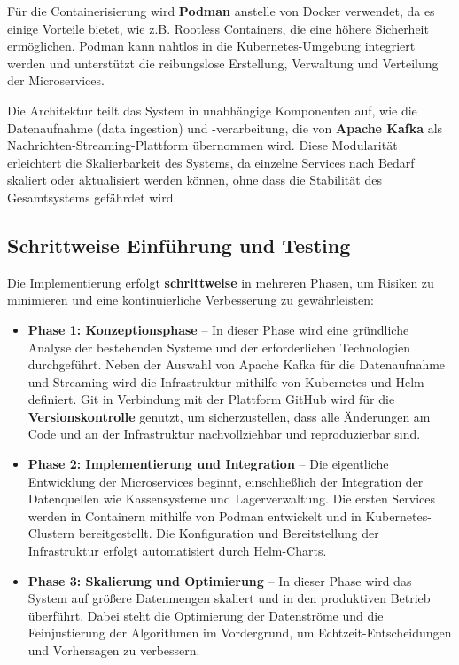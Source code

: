 \documentclass[%
pdftex,
oneside,			%
11pt,				%
parskip=half,		%
headheight = 12pt,	%
headsepline,		%
footsepline,		%
footheight = 16pt,	%
abstracton,		%
DIV=calc,		%
BCOR=8mm,		%
headinclude=false,	%
footinclude=false,	%
listof=totoc,		%
toc=bibliography,	%
]{scrreprt}	%
\begin{document}
        Für die Containerisierung wird \textbf{Podman} anstelle von Docker verwendet, da es einige Vorteile bietet, wie z.B. Rootless Containers, die eine höhere Sicherheit ermöglichen. 
        Podman kann nahtlos in die Kubernetes-Umgebung integriert werden und unterstützt die reibungslose Erstellung, Verwaltung und Verteilung der Microservices.

        Die Architektur teilt das System in unabhängige Komponenten auf, wie die Datenaufnahme (data ingestion) und -verarbeitung, die von \textbf{Apache Kafka} als Nachrichten-Streaming-Plattform übernommen wird. Diese Modularität erleichtert die Skalierbarkeit des Systems, da einzelne Services nach Bedarf skaliert oder aktualisiert werden können, ohne dass die Stabilität des Gesamtsystems gefährdet wird.

    \subsection{Schrittweise Einführung und Testing}

        Die Implementierung erfolgt \textbf{schrittweise} in mehreren Phasen, um Risiken zu minimieren und eine kontinuierliche Verbesserung zu gewährleisten:

        \begin{itemize}
            \item \textbf{Phase 1: Konzeptionsphase} – In dieser Phase wird eine gründliche Analyse der bestehenden Systeme und der erforderlichen Technologien durchgeführt. 
            Neben der Auswahl von Apache Kafka für die Datenaufnahme und Streaming wird die Infrastruktur mithilfe von Kubernetes und Helm definiert. 
            Git in Verbindung mit der Plattform GitHub wird für die \textbf{Versionskontrolle} genutzt, um sicherzustellen, dass alle Änderungen am Code und an der Infrastruktur nachvollziehbar und reproduzierbar sind.
            \item \textbf{Phase 2: Implementierung und Integration} – Die eigentliche Entwicklung der Microservices beginnt, einschließlich der Integration der Datenquellen wie Kassensysteme und Lagerverwaltung. 
            Die ersten Services werden in Containern mithilfe von Podman entwickelt und in Kubernetes-Clustern bereitgestellt. 
            Die Konfiguration und Bereitstellung der Infrastruktur erfolgt automatisiert durch Helm-Charts.
            \item \textbf{Phase 3: Skalierung und Optimierung} – In dieser Phase wird das System auf größere Datenmengen skaliert und in den produktiven Betrieb überführt. 
            Dabei steht die Optimierung der Datenströme und die Feinjustierung der Algorithmen im Vordergrund, um Echtzeit-Entscheidungen und Vorhersagen zu verbessern.
        \end{itemize}
\end{document}

